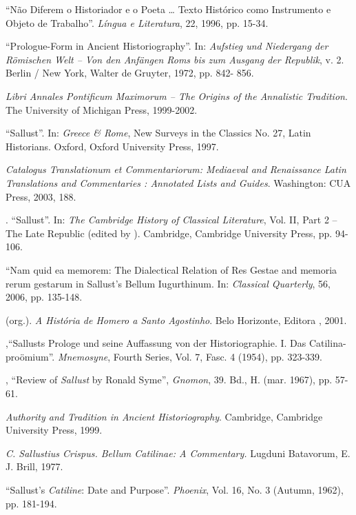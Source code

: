 \begin{bibliohedra}
 
 ``Não Diferem o Historiador e o Poeta … Texto Histórico como Instrumento e Objeto de Trabalho”. \emph{Língua e Literatura}, 22, 1996, pp. 15-34.

  “Prologue-Form in Ancient Historiography”. In: \emph{Aufstieg und Niedergang der Römischen Welt – Von den Anfängen Roms bis zum Ausgang der Republik}, v. 2. Berlin / New York, Walter de Gruyter, 1972, pp. 842- 856.

 

 \emph{Libri Annales Pontificum Maximorum – The Origins of the Annalistic Tradition}. The University of Michigan Press, 1999-2002. 

 “Sallust”. In: \emph{Greece \& Rome}, New Surveys in the Classics No. 27, Latin Historians. Oxford, Oxford University Press, 1997.

 \emph{Catalogus Translationum et Commentariorum: Mediaeval and Renaissance Latin Translations and Commentaries : Annotated Lists and Guides}. Washington: CUA Press, 2003, 188.

. “Sallust”. In: \emph{The Cambridge History of Classical Literature}, Vol. II, Part 2 – The Late Republic (edited by ). Cambridge, Cambridge University Press, pp. 94-106.

 “Nam quid ea memorem: The Dialectical Relation of Res Gestae and memoria rerum gestarum in Sallust’s Bellum Iugurthinum. In: \emph{Classical Quarterly}, 56, 2006, pp. 135-148.

 (org.). \emph{A História de Homero a Santo Agostinho}. Belo Horizonte, Editora , 2001. 

,``Sallusts Prologe und seine Auffassung von der Historiographie. I. Das Catilina-proömium''. \emph{Mnemosyne}, Fourth Series, Vol. 7, Fasc. 4 (1954), pp. 323-339.


, “Review of \emph{Sallust} by Ronald Syme”, \emph{Gnomon}, 39. Bd., H. (mar. 1967), pp. 57-61.

 
 

 \emph{Authority and Tradition in Ancient Historiography}. Cambridge, Cambridge University Press, 1999.

 
  \emph{C. Sallustius Crispus. Bellum Catilinae: A Commentary.} Lugduni Batavorum, E. J. Brill, 1977.
 
  ``Sallust's \emph{Catiline}: Date and Purpose''. \emph{Phoenix}, Vol. 16, No. 3 (Autumn, 1962), pp. 181-194.
 


\end{bibliohedra}
